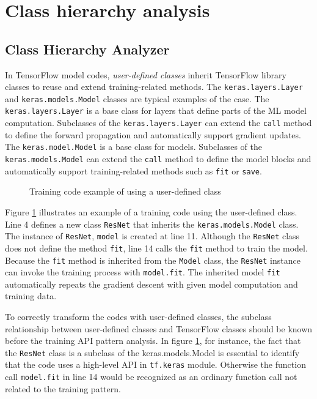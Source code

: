 \section{Class hierarchy analysis}\label{sec:cha}

\subsection{Class Hierarchy Analyzer}

In TensorFlow model codes, \textit{user-defined classes} inherit
TensorFlow library classes to reuse and extend training-related methods.
The {\tt keras.layers.Layer} and {\tt keras.models.Model} classes 
are typical examples of the case.
The {\tt keras.layers.Layer} is a base class for
layers that define parts of the ML model computation.
Subclasses of the {\tt keras.layers.Layer} can extend
the {\tt call} method to define the forward propagation
and automatically support gradient updates.
The {\tt keras.model.Model} is a base class for models.
Subclasses of the {\tt keras.models.Model} can extend
the {\tt call} method to define the model blocks
and automatically support training-related methods
such as {\tt fit} or {\tt save}. 

\begin{figure}[h]

\caption{Training code example of using a user-defined class}
\label{fig:cha:ex}
\end{figure}

Figure \ref{fig:cha:ex} illustrates an example of a training code
using the user-defined class. 
Line 4 defines a new class {\tt ResNet} that inherits the  
{\tt keras.models.Model} class. The instance of {\tt ResNet}, {\tt model}
is created at line 11. Although the {\tt ResNet} class does not define
the method {\tt fit}, line 14 calls the {\tt fit} method to train the model.
Because the {\tt fit} method is inherited from the {\tt Model} class,
the {\tt ResNet} instance can invoke the training process with
{\tt model.fit}. The inherited model {\tt fit}
automatically repeats the gradient descent with
given model computation and training data. 

To correctly transform the codes with user-defined classes,
the subclass relationship between user-defined classes
and TensorFlow classes should be known before the training API pattern analysis. 
In figure \ref{fig:cha:ex}, for instance, 
the fact that the {\tt ResNet} class
is a subclass of the {keras.models.Model} is essential to identify
that the code uses a high-level API in {\tt tf.keras} module. 
Otherwise the function call {\tt model.fit} in line 14 would
be recognized as an ordinary function call not related to the training pattern.


